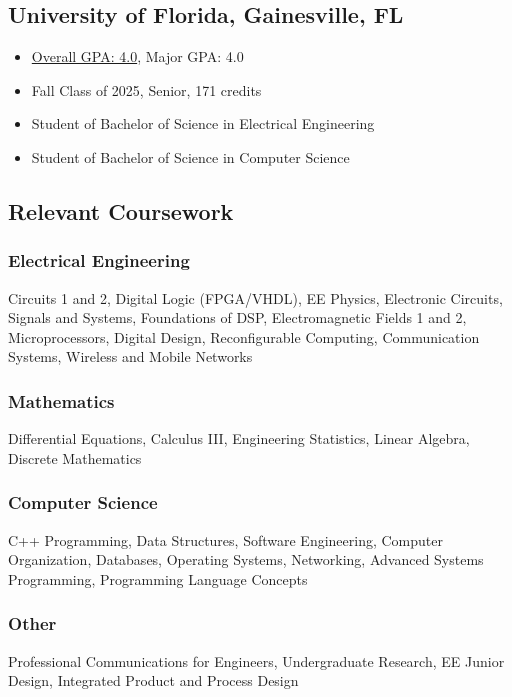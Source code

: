 \documentclass{article}
\newcommand\halftextbox[1]{%
  \parbox[t]{.475\textwidth}{#1}%
}
\newcommand\spacetextbox[1]{%
  \parbox{.05\textwidth}{#1}%
}
\newenvironment{CustomItemize}
{ \begin{itemize}[leftmargin=1em]
    \setlength{\itemsep}{0pt}
    \setlength{\parskip}{0pt}
    \setlength{\parindent}{0pt}
    \setlength{\parsep}{0pt}     }
{ \end{itemize}                  }
\begin{document}
\noindent
\halftextbox{
\begin{raggedright}
\subsection{University of Florida,  Gainesville, FL}
\begin{CustomItemize}
\item \underline{Overall GPA: 4.0}, Major GPA: 4.0
\item Fall Class of 2025, Senior, 171 credits
\item Student of Bachelor of Science in Electrical Engineering
\item Student of Bachelor of Science in Computer Science
\end{CustomItemize}

\subsection{Relevant Coursework}
\subsubsection{Electrical Engineering}
Circuits 1 and 2,
Digital Logic (FPGA/VHDL),
EE Physics,
Electronic Circuits,
Signals and Systems,
Foundations of DSP,
Electromagnetic Fields 1 and 2,
Microprocessors,
Digital Design,
Reconfigurable Computing,
Communication Systems,
Wireless and Mobile Networks
\end{raggedright}
}
\spacetextbox{\hfil\hfil}
\halftextbox{
\begin{raggedright}
\subsubsection{Mathematics}
Differential Equations,
Calculus III,
Engineering Statistics, 
Linear Algebra,
Discrete Mathematics
\subsubsection{Computer Science}
C++ Programming,
Data Structures,
Software Engineering,
Computer Organization,
Databases,
Operating Systems,
Networking,
Advanced Systems Programming,
Programming Language Concepts

\subsubsection{Other}
Professional Communications for Engineers,
Undergraduate Research,
EE Junior Design,
Integrated Product and Process Design

\end{raggedright}
}
\end{document}
